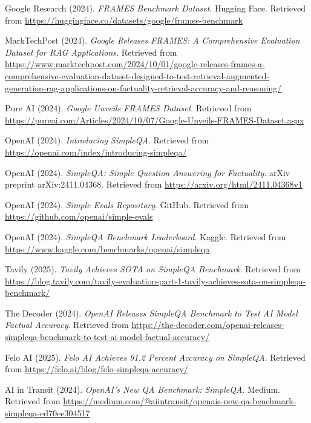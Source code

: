 \documentclass[10pt,a4paper]{article}
\begin{document}
\begin{thebibliography}{99}
Google Research (2024).
\textit{FRAMES Benchmark Dataset}.
Hugging Face. Retrieved from \url{https://huggingface.co/datasets/google/frames-benchmark}

MarkTechPost (2024).
\textit{Google Releases FRAMES: A Comprehensive Evaluation Dataset for RAG Applications}.
Retrieved from \url{https://www.marktechpost.com/2024/10/01/google-releases-frames-a-comprehensive-evaluation-dataset-designed-to-test-retrieval-augmented-generation-rag-applications-on-factuality-retrieval-accuracy-and-reasoning/}

Pure AI (2024).
\textit{Google Unveils FRAMES Dataset}.
Retrieved from \url{https://pureai.com/Articles/2024/10/07/Google-Unveils-FRAMES-Dataset.aspx}

OpenAI (2024).
\textit{Introducing SimpleQA}.
Retrieved from \url{https://openai.com/index/introducing-simpleqa/}

OpenAI (2024).
\textit{SimpleQA: Simple Question Answering for Factuality}.
arXiv preprint arXiv:2411.04368.
Retrieved from \url{https://arxiv.org/html/2411.04368v1}

OpenAI (2024).
\textit{Simple Evals Repository}.
GitHub. Retrieved from \url{https://github.com/openai/simple-evals}

OpenAI (2024).
\textit{SimpleQA Benchmark Leaderboard}.
Kaggle. Retrieved from \url{https://www.kaggle.com/benchmarks/openai/simpleqa}

Tavily (2025).
\textit{Tavily Achieves SOTA on SimpleQA Benchmark}.
Retrieved from \url{https://blog.tavily.com/tavily-evaluation-part-1-tavily-achieves-sota-on-simpleqa-benchmark/}

The Decoder (2024).
\textit{OpenAI Releases SimpleQA Benchmark to Test AI Model Factual Accuracy}.
Retrieved from \url{https://the-decoder.com/openai-releases-simpleqa-benchmark-to-test-ai-model-factual-accuracy/}

Felo AI (2025).
\textit{Felo AI Achieves 91.2 Percent Accuracy on SimpleQA}.
Retrieved from \url{https://felo.ai/blog/felo-simpleqa-accuracy/}

AI in Transit (2024).
\textit{OpenAI's New QA Benchmark: SimpleQA}.
Medium. Retrieved from \url{https://medium.com/@aiintransit/openais-new-qa-benchmark-simpleqa-ed70ee304517}


\end{thebibliography}
\end{document}
